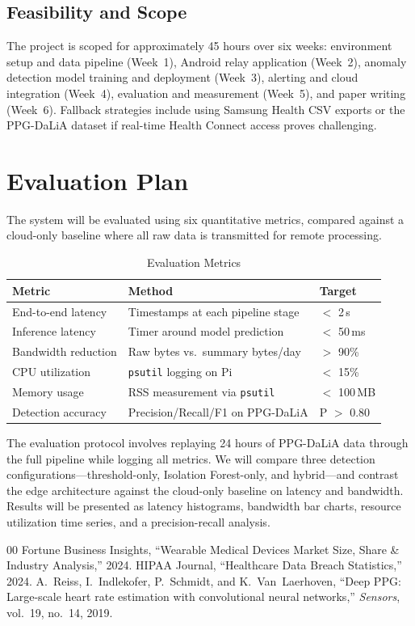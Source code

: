 \documentclass[conference]{IEEEtran}
\begin{document}
\subsection{Feasibility and Scope}

The project is scoped for approximately 45 hours over six weeks: environment setup and data pipeline (Week~1), Android relay application (Week~2), anomaly detection model training and deployment (Week~3), alerting and cloud integration (Week~4), evaluation and measurement (Week~5), and paper writing (Week~6). Fallback strategies include using Samsung Health CSV exports or the PPG-DaLiA dataset if real-time Health Connect access proves challenging.

\section{Evaluation Plan}

The system will be evaluated using six quantitative metrics, compared against a cloud-only baseline where all raw data is transmitted for remote processing.

\begin{table}[htbp]
\caption{Evaluation Metrics}
\label{tab:eval}
\centering
\footnotesize
\begin{tabularx}{\columnwidth}{lXl}
\toprule
\textbf{Metric} & \textbf{Method} & \textbf{Target} \\
\midrule
End-to-end latency & Timestamps at each pipeline stage & $<$ 2\,s \\
Inference latency & Timer around model prediction & $<$ 50\,ms \\
Bandwidth reduction & Raw bytes vs.\ summary bytes/day & $>$ 90\% \\
CPU utilization & \texttt{psutil} logging on Pi & $<$ 15\% \\
Memory usage & RSS measurement via \texttt{psutil} & $<$ 100\,MB \\
Detection accuracy & Precision/Recall/F1 on PPG-DaLiA & P $>$ 0.80 \\
\bottomrule
\end{tabularx}
\end{table}

The evaluation protocol involves replaying 24 hours of PPG-DaLiA data through the full pipeline while logging all metrics. We will compare three detection configurations---threshold-only, Isolation Forest-only, and hybrid---and contrast the edge architecture against the cloud-only baseline on latency and bandwidth. Results will be presented as latency histograms, bandwidth bar charts, resource utilization time series, and a precision-recall analysis.

\begin{thebibliography}{00}
 Fortune Business Insights, ``Wearable Medical Devices Market Size, Share \& Industry Analysis,'' 2024.
 HIPAA Journal, ``Healthcare Data Breach Statistics,'' 2024.
 A.~Reiss, I.~Indlekofer, P.~Schmidt, and K.~Van~Laerhoven, ``Deep PPG: Large-scale heart rate estimation with convolutional neural networks,'' \textit{Sensors}, vol.~19, no.~14, 2019.
\end{thebibliography}
\end{document}
